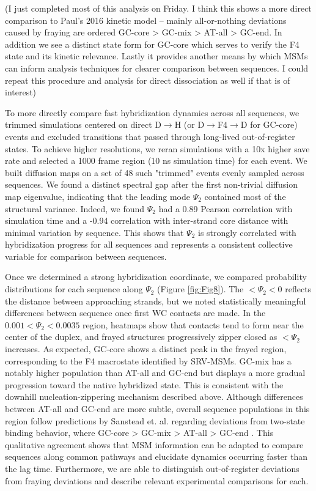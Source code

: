 \documentclass[journal=jpcbfk,manuscript=article]{achemso}
\begin{document}
(I just completed most of this analysis on Friday. I think this shows a more direct comparison to Paul's 2016 kinetic model -- mainly all-or-nothing deviations caused by fraying are ordered GC-core > GC-mix > AT-all > GC-end. In addition we see a distinct state form for GC-core which serves to verify the F4 state and its kinetic relevance. Lastly it provides another means by which MSMs can inform analysis techniques for clearer comparison between sequences. I could repeat this procedure and analysis for direct dissociation as well if that is of interest)

To more directly compare fast hybridization dynamics across all sequences, we trimmed simulations centered on direct D$\rightarrow$H (or D$\rightarrow$F4$\rightarrow$D for GC-core) events and excluded transitions that passed through long-lived out-of-register states. To achieve higher resolutions, we reran simulations with a 10x higher save rate and selected a 1000 frame region (10 ns simulation time) for each event. We built diffusion maps on a set of 48 such "trimmed" events evenly sampled across sequences. We found a distinct spectral gap after the first non-trivial diffusion map eigenvalue, indicating that the leading mode $\Psi_2$ contained most of the structural variance. Indeed, we found $\Psi_2$ had a 0.89 Pearson correlation with simulation time and a  -0.94 correlation with inter-strand core distance with minimal variation by sequence. This shows that $\Psi_2$ is strongly correlated with hybridization progress for all sequences and represents a consistent collective variable for comparison between sequences. 

Once we determined a strong hybridization coordinate, we compared probability distributions for each sequence along $\Psi_2$ (Figure \ref{fig:Fig8}). The $ <\Psi_2 < 0$ reflects the distance between approaching strands, but we noted statistically meaningful differences between sequence once first WC contacts are made. In the $ 0.001 <\Psi_2 < 0.0035$ region, heatmaps show that contacts tend to form near the center of the duplex, and frayed structures progressively zipper closed as $<\Psi_2$ increases. As expected, GC-core shows a distinct peak in the frayed region, corresponding to the F4 macrostate identified by SRV-MSMs. GC-mix has a notably higher population than AT-all and GC-end but displays a more gradual progression toward the native hybridized state. This is consistent with the downhill nucleation-zippering mechanism described above. Although differences between AT-all and GC-end are more subtle, overall sequence populations in this region follow predictions by Sanstead et. al. regarding deviations from two-state binding behavior, where GC-core > GC-mix > AT-all > GC-end \citep{Sanstead2016}. This qualitative agreement shows that MSM information can be adapted to compare sequences along common pathways and elucidate dynamics occurring faster than the lag time. Furthermore, we are able to distinguish out-of-register deviations from fraying deviations and describe relevant experimental comparisons for each.
\end{document}
